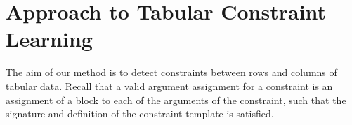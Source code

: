 \documentclass{IEEEtran}
\newcommand{\constraints}{\ensuremath{\mathcal{T}}\xspace}
\newcommand{\format}[1]{\textit{#1}\xspace}
\newcommand{\template}{\format{constraint template}}
\newcommand{\dependencies}{\ensuremath{\mathcal{D}}\xspace}
\newcommand{\groups}{\ensuremath{\mathcal{B}}\xspace}
\theoremstyle{definition}
\newtheorem{definition}{Definition}
\begin{document}
%







\newcommand{\tcl}{Tabular Constraint Learning}
\section{Approach to Tabular Constraint Learning}\label{sec:approach}
The aim of our method is to detect constraints between rows and columns of tabular data. Recall that a valid argument assignment for a constraint is an assignment of a block to each of the arguments of the constraint, such that the signature and definition of the constraint template is satisfied.
\end{document}
